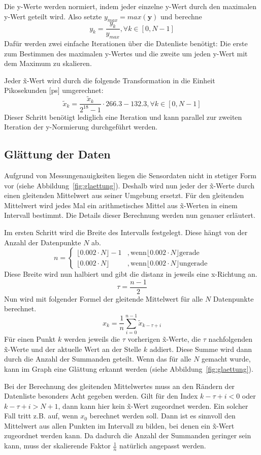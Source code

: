 Die y-Werte werden normiert, indem jeder einzelne y-Wert durch den maximalen y-Wert geteilt wird.
Also setzte $y_{max} = max(\bm{y})$ und berechne
\[
    y_k = \frac{y_k}{y_{max}}, \forall k \in [0, N - 1]
\]
Dafür werden zwei einfache Iterationen über die Datenliste benötigt:
Die erste zum Bestimmen des maximalen y-Wertes und die zweite um jeden y-Wert mit dem Maximum zu skalieren.

Jeder \~x-Wert wird durch die folgende Transformation in die Einheit Pikosekunden [ps] umgerechnet:
\[
    \tilde{x}_k = \frac{\tilde{x}_k}{2^{18} - 1} \cdot 266.3 - 132.3, \forall k \in [0, N - 1]
\]
Dieser Schritt benötigt lediglich eine Iteration und kann parallel zur zweiten Iteration der y-Normierung durchgeführt werden.

\subsection{Glättung der Daten}\label{subsec:glaettung}
Aufgrund von Messungenauigkeiten liegen die Sensordaten nicht in stetiger Form vor (siehe Abbildung~\ref{fig:glaettung}).
Deshalb wird nun jeder der \~x-Werte durch einen gleitenden Mittelwert aus seiner Umgebung ersetzt.
Für den gleitenden Mittelwert wird jedes Mal ein arithmetisches Mittel aus \~x-Werten in einem Intervall bestimmt.
Die Details dieser Berechnung werden nun genauer erläutert.

Im ersten Schritt wird die Breite des Intervalls festgelegt.
Diese hängt von der Anzahl der Datenpunkte $N$ ab.
\[
    n =
    \begin{cases}
        \lfloor0.002 \cdot N \rfloor - 1 & , \text{wenn} \lfloor0.002 \cdot N \rfloor \text{gerade} \\
        \lfloor0.002 \cdot N \rfloor     & , \text{wenn} \lfloor0.002 \cdot N \rfloor \text{ungerade}
    \end{cases}
\]
Diese Breite wird nun halbiert und gibt die distanz in jeweils eine x-Richtung an.
\[
    \tau = \frac{n - 1}{2}
\]
Nun wird mit folgender Formel der gleitende Mittelwert für alle $N$ Datenpunkte berechnet.
\[
    x_k = \frac{1}{n} \sum_{i = 0}^{n - 1} \tilde{x}_{k-\tau+i}
\]
Für einen Punkt $k$ werden jeweils die $\tau$ vorherigen \~x-Werte, die $\tau$ nachfolgenden \~x-Werte und der aktuelle Wert an der Stelle $k$ addiert.
Diese Summe wird dann durch die Anzahl der Summanden geteilt.
Wenn das für alle $N$ gemacht wurde, kann im Graph eine Glättung erkannt werden (siehe Abbildung~\ref{fig:glaettung}).

Bei der Berechnung des gleitenden Mittelwertes muss an den Rändern der Datenliste besonders Acht gegeben werden.
Gilt für den Index $k-\tau+i < 0$ oder $k-\tau+i > N + 1$, dann kann hier kein \~x-Wert zugeordnet werden.
Ein solcher Fall tritt z.B. auf, wenn $x_0$ berechnet werden soll.
Dann ist es sinnvoll den Mittelwert aus allen Punkten im Intervall zu bilden, bei denen ein \~x-Wert zugeordnet werden kann.
Da dadurch die Anzahl der Summanden geringer sein kann, muss der skalierende Faktor $\frac{1}{n}$ natürlich angepasst werden.


